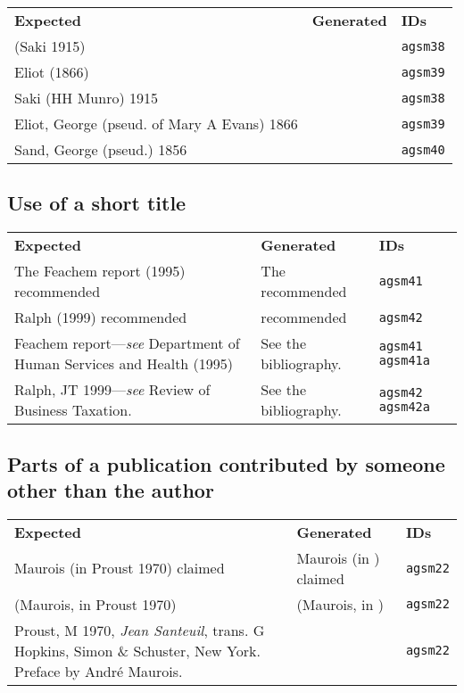 \documentclass[a4paper,landscape,12pt]{article}
\newlength\q
\newlength\qr
\newenvironment{citetable}
  {\noindent\begin{longtable}{p{\q} p{\q} p{\qr}}\textbf{Expected} & \textbf{Generated} & \textbf{IDs}\\}
  {\end{longtable}}
\newcommand{\minorissue}[1]{\textcolor{blue}{#1}}
\begin{document}
\begin{citetable}
	(Saki 1915) & \parencite{agsm38} & \texttt{agsm38} \\
	Eliot (1866) & \textcite{agsm39} & \texttt{agsm39} \\
	Saki (HH Munro) 1915 & \fullcite{agsm38} & \texttt{agsm38} \\
	Eliot, George (pseud. of Mary A Evans) 1866 & \fullcite{agsm39} & \texttt{agsm39} \\
	Sand, George (pseud.) 1856 & \fullcite{agsm40} & \texttt{agsm40} \\
\end{citetable}

\subsection{Use of a short title}

\begin{citetable}
	The Feachem report (1995) recommended & The \textcite{agsm41} recommended & \texttt{agsm41} \\
	Ralph (1999) recommended & \textcite{agsm42} recommended & \texttt{agsm42} \\
	Feachem report---\textit{see} Department of Human Services and Health (1995) & See the bibliography.\nocite{agsm41,agsm41a} & \texttt{agsm41} \texttt{agsm41a} \\
	Ralph, JT 1999---\textit{see} Review of Business Taxation. & See the bibliography.\nocite{agsm42,agsm42a} & \texttt{agsm42} \texttt{agsm42a} \\
\end{citetable}

\subsection{Parts of a publication contributed by someone other than the author}

\begin{citetable}
	Maurois (in Proust 1970) claimed & Maurois (in \cite{agsm22}) claimed & \texttt{agsm22} \\
	(Maurois, in Proust 1970) & (Maurois, in \cite{agsm22}) & \texttt{agsm22} \\
	Proust, M 1970, \textit{Jean Santeuil}, trans. G Hopkins, Simon \& Schuster, New York. Preface by Andr\'{e} Maurois. & \minorissue{\fullcite{agsm22}} & \texttt{agsm22} \\
\end{citetable}
\end{document}

